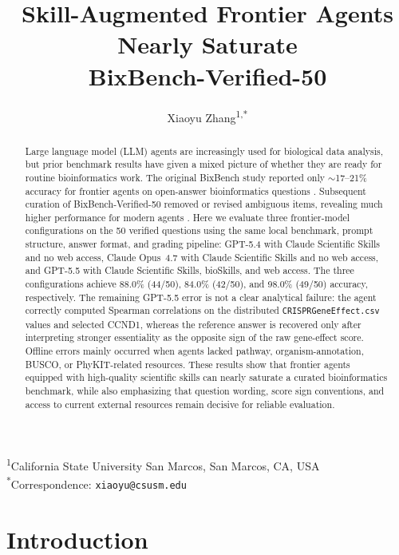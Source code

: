 \documentclass[11pt]{article}
\title{Skill-Augmented Frontier Agents Nearly Saturate\\
BixBench-Verified-50}
\author{Xiaoyu Zhang\textsuperscript{1,*}}
\date{}
\begin{document}
\maketitle

\begin{center}
\textsuperscript{1}California State University San Marcos, San Marcos, CA, USA\\
\textsuperscript{*}Correspondence: \texttt{xiaoyu@csusm.edu}
\end{center}

\begin{abstract}
\noindent
Large language model (LLM) agents are increasingly used for biological data
analysis, but prior benchmark results have given a mixed picture of whether
they are ready for routine bioinformatics work. The original BixBench study
reported only $\sim$17--21\% accuracy for frontier agents on open-answer
bioinformatics questions \citep{mitchener2025bixbench}. Subsequent curation
of BixBench-Verified-50 removed or revised ambiguous items, revealing much
higher performance for modern agents \citep{phylo2026}. Here we evaluate
three frontier-model configurations on the 50 verified questions using the
same local benchmark, prompt structure, answer format, and grading pipeline:
GPT-5.4 with Claude Scientific Skills and no web access, Claude Opus~4.7 with
Claude Scientific Skills and no web access, and GPT-5.5 with Claude
Scientific Skills, bioSkills, and web access. The three configurations
achieve 88.0\% (44/50), 84.0\% (42/50), and 98.0\% (49/50) accuracy,
respectively. The remaining GPT-5.5 error is not a clear analytical failure:
the agent correctly computed Spearman correlations on the distributed
\texttt{CRISPRGeneEffect.csv} values and selected CCND1, whereas the
reference answer is recovered only after interpreting stronger essentiality
as the opposite sign of the raw gene-effect score. Offline errors mainly
occurred when agents lacked pathway, organism-annotation, BUSCO, or
PhyKIT-related resources. These results show that frontier agents equipped
with high-quality scientific skills can nearly saturate a curated
bioinformatics benchmark, while also emphasizing that question wording, score
sign conventions, and access to current external resources remain decisive
for reliable evaluation.
\end{abstract}

\doublespacing
\linenumbers

\section{Introduction}
\end{document}
